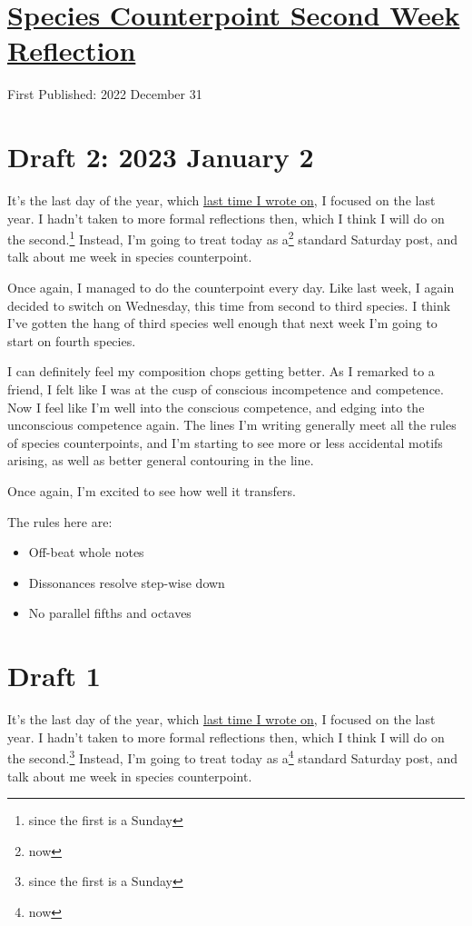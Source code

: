 \documentclass[12pt]{article}[titlepage]
\newcommand{\1}{\={a}}
\newcommand{\2}{\={e}}
\newcommand{\3}{\={\i}}
\newcommand{\4}{\=o}
\newcommand{\5}{\=u}
\newcommand{\6}{\={A}}
\renewcommand{\,}{\textsuperscript{,}}
\begin{document}
\doublespacing
\section{\href{species-counterpoint-week-2.html}{Species Counterpoint Second Week Reflection}}
First Published: 2022 December 31
\section{Draft 2: 2023 January 2}
It's the last day of the year, which \href{ending-18.html}{last time I wrote on}, I focused on the last year.
I hadn't taken to more formal reflections then, which I think I will do on the second.\footnote{since the first is a Sunday}
Instead, I'm going to treat today as a\footnote{now} standard Saturday post, and talk about me week in species counterpoint.

Once again, I managed to do the counterpoint every day.
Like last week, I again decided to switch on Wednesday, this time from second to third species.
I think I've gotten the hang of third species well enough that next week I'm going to start on fourth species.

I can definitely feel my composition chops getting better.
As I remarked to a friend, I felt like I was at the cusp of conscious incompetence and competence.
Now I feel like I'm well into the conscious competence, and edging into the unconscious competence again.
The lines I'm writing generally meet all the rules of species counterpoints, and I'm starting to see more or less accidental motifs arising, as well as better general contouring in the line.

Once again, I'm excited to see how well it transfers.

The rules here are:
\begin{itemize}
\item Off-beat whole notes
\item Dissonances resolve step-wise down
\item No parallel fifths and octaves
\end{itemize}


\section{Draft 1}
It's the last day of the year, which \href{ending-18.html}{last time I wrote on}, I focused on the last year.
I hadn't taken to more formal reflections then, which I think I will do on the second.\footnote{since the first is a Sunday}
Instead, I'm going to treat today as a\footnote{now} standard Saturday post, and talk about me week in species counterpoint.
\end{document}
